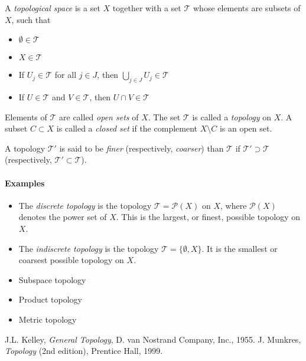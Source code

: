 \documentclass{article}
\begin{document}
A {\em topological space} is a set $X$ together with a set $\mathcal{T}$ whose elements are subsets of $X$, such that
\begin{itemize}
\item $\emptyset \in \mathcal{T}$
\item $X \in \mathcal{T}$
\item If $U_j \in \mathcal{T}$ for all $j \in J$, then $\bigcup_{j \in J} U_j \in \mathcal{T}$
\item If $U \in \mathcal{T}$ and $V \in \mathcal{T}$, then $U \cap V \in \mathcal{T}$
\end{itemize}

Elements of $\mathcal{T}$ are called {\em open sets} of $X$. The set $\mathcal{T}$ is called a {\em topology} on $X$. A subset $C \subset X$ is called a {\em closed set} if the complement $X \setminus C$ is an open set.

A topology $\mathcal{T}'$ is said to be {\em finer} (respectively, {\em coarser}) than $\mathcal{T}$ if $\mathcal{T}' \supset \mathcal{T}$ (respectively, $\mathcal{T}' \subset \mathcal{T}$).

\paragraph{Examples}

\begin{itemize}
\item The {\em discrete topology} is the topology $\mathcal{T} = \mathcal{P}(X)$ on $X$, where $\mathcal{P}(X)$ denotes the power set of $X$.  This is the largest, or finest, possible topology on $X$.
\item The {\em indiscrete topology} is the topology $\mathcal{T} = \{\emptyset, X\}$.  It is the smallest or coarsest possible topology on $X$.
\item Subspace topology
\item Product topology
\item Metric topology
\end{itemize}


\begin{thebibliography}{9}
 J.L. Kelley, \emph{General Topology},
 D. van Nostrand Company, Inc., 1955.
 J. Munkres, \emph{Topology} (2nd edition), Prentice Hall, 1999.
\end{thebibliography}
\end{document}
